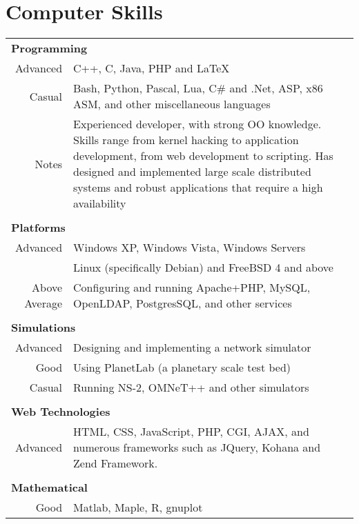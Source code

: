 \documentclass[a4paper,10pt]{article}
\begin{document}
\section{Computer Skills}
\begin{tabular}{r|p{12cm}}

\multicolumn{2}{l}{\textbf{Programming}} \\
Advanced & C++, C, Java, PHP and \LaTeX \\
Casual   & Bash, Python, Pascal, Lua, C\# and .Net, ASP, x86 ASM, and other miscellaneous languages \\
Notes    & Experienced developer, with strong OO knowledge. Skills range from kernel hacking to application development, from web development to scripting. Has designed and implemented large scale distributed systems and robust applications that require a high availability\\

\multicolumn{2}{l}{} \\
\multicolumn{2}{l}{\textbf{Platforms}} \\
Advanced       & Windows XP, Windows Vista, Windows Servers\\
               & Linux (specifically Debian) and FreeBSD 4 and above\\
Above Average  & Configuring and running Apache+PHP, MySQL, OpenLDAP, PostgresSQL, and other services\\

\multicolumn{2}{l}{} \\
\multicolumn{2}{l}{\textbf{Simulations}} \\
Advanced & Designing and implementing a network simulator\\
Good     & Using PlanetLab (a planetary scale test bed)\\
Casual   & Running NS-2, OMNeT++ and other simulators\\

\multicolumn{2}{l}{} \\
\multicolumn{2}{l}{\textbf{Web Technologies}} \\
Advanced & HTML, CSS, JavaScript, PHP, CGI, AJAX, and numerous frameworks such as JQuery, Kohana and Zend Framework.\\

\multicolumn{2}{l}{} \\
\multicolumn{2}{l}{\textbf{Mathematical}} \\
Good & Matlab, Maple, R, gnuplot\\

\end{tabular}
\end{document}
